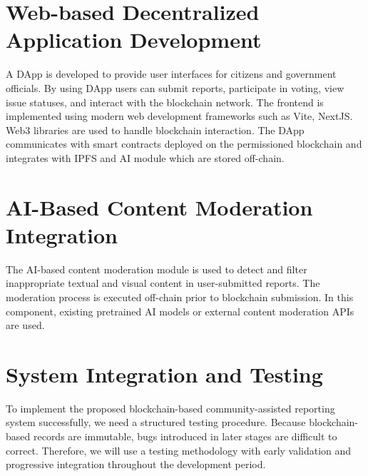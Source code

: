 \section{Web-based Decentralized Application Development}

A \ac{DApp} is developed to provide user interfaces for citizens and government officials. By using \ac{DApp} users can submit reports, participate in voting, view issue statuses, and interact with the blockchain network. The frontend is implemented using modern web development frameworks such as Vite, NextJS. Web3 libraries are used to handle blockchain interaction. The \ac{DApp} communicates with smart contracts deployed on the permissioned blockchain and integrates with IPFS and AI module which are stored off-chain.




\section{AI-Based Content Moderation Integration}

The AI-based content moderation module is used to detect and filter inappropriate textual and visual content in user-submitted reports. The moderation process is executed off-chain prior to blockchain submission. In this component, existing pretrained AI models or external content moderation APIs are used.

\section{System Integration and Testing}

To implement the proposed blockchain-based community-assisted reporting system successfully, we need a structured testing procedure. Because blockchain-based records are immutable, bugs introduced in later stages are difficult to correct. Therefore, we will use a testing methodology with early validation and progressive integration throughout the development period. 

